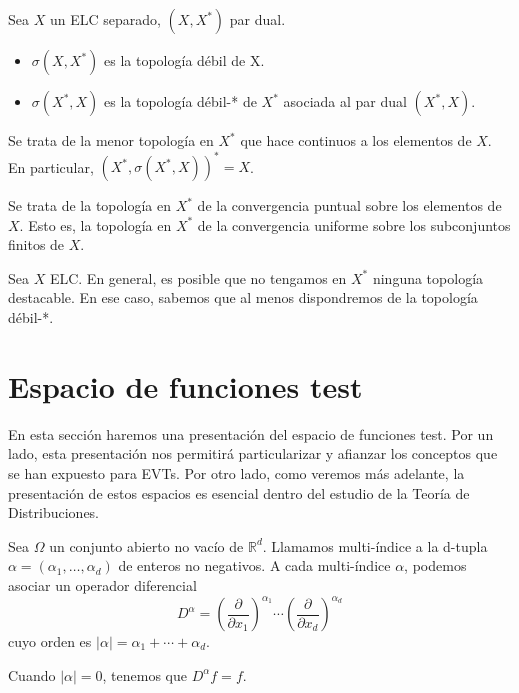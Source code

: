 \begin{definicion}

Sea $X$ un ELC separado, $(X,X^{*})$ par dual.
\begin{itemize}
	\item $\sigma (X,X^{*})$ es la topología débil de X.
	\item $\sigma (X^{*},X)$ es la topología débil-* de $X^{*}$ asociada al par dual $(X^{*},X)$.
\end{itemize}
\end{definicion}

\begin{observacion}
 Se trata de la menor topología en $X^{*}$ que hace continuos a los elementos de $X$. En particular, $(X^{*},\sigma (X^{*},X))^{*} = X$.
\end{observacion}

\begin{observacion}
Se trata de la topología en $X^{*}$ de la convergencia puntual sobre los elementos de $X$. Esto es, la topología en $X^{*}$ de la convergencia uniforme sobre los subconjuntos finitos de $X$.
\end{observacion}

\begin{observacion}
Sea $X$ ELC. En general, es posible que no tengamos en $X^{*}$ ninguna topología destacable. En ese caso, sabemos que al menos dispondremos de la topología débil-*.
\end{observacion}
\section{Espacio de funciones test}

En esta sección haremos una presentación del espacio de funciones test. Por un lado, esta presentación nos permitirá particularizar y afianzar los conceptos que se han expuesto para EVTs. Por otro lado, como veremos más adelante, la presentación de estos espacios es esencial dentro del estudio de la Teoría de Distribuciones.
\begin{definicion}
Sea $\Omega$ un conjunto abierto no vacío de $\mathds{R}^{d}$. Llamamos multi-índice a la d-tupla  $\alpha = (\alpha_{1},\ldots,\alpha_{d})$ de enteros no negativos. A cada multi-índice $\alpha$, podemos asociar un operador diferencial
\begin{equation}
D^{\alpha} = 
\left(\frac{\partial}{\partial x_{1}}\right)^{\alpha_{1}}\cdots \left(\frac{\partial}{\partial x_{d}}\right)^{\alpha_{d}}
\end{equation}
cuyo orden es  $\vert\alpha\vert = \alpha_{1} + \dotsb + \alpha_{d}$.
\end{definicion}
\begin{observacion}
Cuando $\vert\alpha\vert = 0$, tenemos que $D^{\alpha}f=f$.
\end{observacion}

